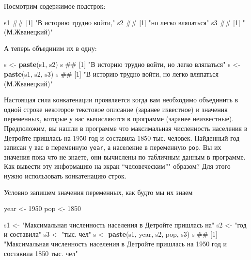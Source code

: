 \documentclass[]{book}
\newenvironment{Shaded}{\begin{snugshade}}{\end{snugshade}}
\newcommand{\KeywordTok}[1]{\textcolor[rgb]{0.13,0.29,0.53}{\textbf{#1}}}
\newcommand{\DecValTok}[1]{\textcolor[rgb]{0.00,0.00,0.81}{#1}}
\newcommand{\StringTok}[1]{\textcolor[rgb]{0.31,0.60,0.02}{#1}}
\newcommand{\NormalTok}[1]{#1}
\begin{document}
Посмотрим содержимое подстрок:

\begin{Shaded}
\begin{Highlighting}[]
\NormalTok{s1}
\NormalTok{## [1] "В историю трудно войти,"}
\NormalTok{s2}
\NormalTok{## [1] "но легко вляпаться"}
\NormalTok{s3}
\NormalTok{## [1] "(М.Жванецкий)"}
\end{Highlighting}
\end{Shaded}

А теперь объединим их в одну:

\begin{Shaded}
\begin{Highlighting}[]
\NormalTok{s <-}\StringTok{ }\KeywordTok{paste}\NormalTok{(s1, s2)}
\NormalTok{s}
\NormalTok{## [1] "В историю трудно войти, но легко вляпаться"}
\NormalTok{s <-}\StringTok{ }\KeywordTok{paste}\NormalTok{(s1, s2, s3)}
\NormalTok{s}
\NormalTok{## [1] "В историю трудно войти, но легко вляпаться (М.Жванецкий)"}
\end{Highlighting}
\end{Shaded}

Настоящая сила конкатенации проявляется когда вам необходимо объединить
в одной строке некоторое текстовое описание (заранее известное) и
значения переменных, которые у вас вычисляются в программе (заранее
неизвестные). Предположим, вы нашли в программе что максимальная
численность населения в Детройте пришлась на 1950 год и составила 1850
тыс. человек. Найденный год записан у вас в переменную \texttt{year}, а
население в переменную \texttt{pop}. Вы их значения пока что не знаете,
они вычислены по табличным данным в программе. Как вывести эту
информацию на экран ``человеческим''" образом? Для этого нужно
использовать конкатенацию строк.

Условно запишем значения переменных, как будто мы их знаем

\begin{Shaded}
\begin{Highlighting}[]
\NormalTok{year <-}\StringTok{ }\DecValTok{1950}
\NormalTok{pop <-}\StringTok{ }\DecValTok{1850}
\end{Highlighting}
\end{Shaded}

\begin{Shaded}
\begin{Highlighting}[]
\NormalTok{s1 <-}\StringTok{ "Максимальная численность населения в Детройте пришлась на"}
\NormalTok{s2 <-}\StringTok{ "год и составила"}
\NormalTok{s3 <-}\StringTok{ "тыс. чел"}
\NormalTok{s <-}\StringTok{ }\KeywordTok{paste}\NormalTok{(s1, year, s2, pop, s3)}
\NormalTok{s}
\NormalTok{## [1] "Максимальная численность населения в Детройте пришлась на 1950 год и составила 1850 тыс. чел"}
\end{Highlighting}
\end{Shaded}
\end{document}
